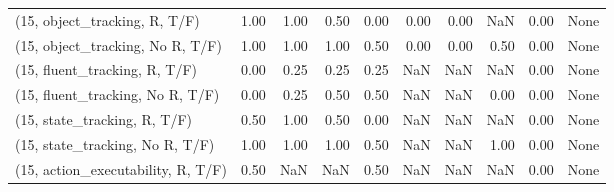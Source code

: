 \begin{table*}[h!]
\begin{adjustbox}{width=2\columnwidth,center}
\begin{tabular}{lrrr|rrr|rrr}
\midrule
(15, object\_tracking, R, T/F)         &                      1.00 &                  1.00 &                      0.50 &                          0.00 &                      0.00 &                          0.00 &                                    NaN &                               0.00 &                                  None \\
(15, object\_tracking, No R, T/F)      &                      1.00 &                  1.00 &                      1.00 &                          0.50 &                      0.00 &                          0.00 &                                   0.50 &                               0.00 &                                  None \\
(15, fluent\_tracking, R, T/F)         &                      0.00 &                  0.25 &                      0.25 &                          0.25 &                       NaN &                           NaN &                                    NaN &                               0.00 &                                  None \\
(15, fluent\_tracking, No R, T/F)      &                      0.00 &                  0.25 &                      0.50 &                          0.50 &                       NaN &                           NaN &                                   0.00 &                               0.00 &                                  None \\
(15, state\_tracking, R, T/F)          &                      0.50 &                  1.00 &                      0.50 &                          0.00 &                       NaN &                           NaN &                                    NaN &                               0.00 &                                  None \\
(15, state\_tracking, No R, T/F)       &                      1.00 &                  1.00 &                      1.00 &                          0.50 &                       NaN &                           NaN &                                   1.00 &                               0.00 &                                  None \\
(15, action\_executability, R, T/F)    &                      0.50 &                   NaN &                       NaN &                          0.50 &                       NaN &                           NaN &                                    NaN &                               0.00 &                                  None \\

\end{tabular}
\end{adjustbox}
\end{table*}
